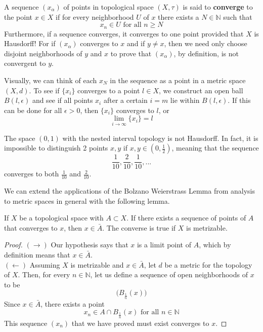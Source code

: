 \documentclass{article}
\begin{document}
    \begin{definition}
    A sequence $(x_\alpha)$ of points in topological space $(X, \tau)$ is said to \textbf{converge} to the point $x \in X$ if for every neighborhood $U$ of $x$ there exists a $N \in \mathbb{N}$ such that
    \[x_n \in U \text{ for all } n \geq N\]
    Furthermore, if a sequence converges, it converges to one point provided that $X$ is Hausdorff! For if $(x_\alpha)$ converges to $x$ and if $y \neq x$, then we need only choose disjoint neighborhoods of $y$ and $x$ to prove that $(x_\alpha)$, by definition, is not convergent to $y$.
    \end{definition}

    Visually, we can think of each $x_N$ in the sequence as a point in a metric space $(X, d)$. To see if $\{ x_i \}$ converges to a point $l \in X$, we construct an open ball $B(l, \epsilon)$ and see if all points $x_i$ after a certain $i = m$ lie within $B (l, \epsilon)$. If this can be done for all $\epsilon > 0$, then $\{ x_i \}$ converges to $l$, or 
    \[\lim_{i \to \infty} \{ x_i \} = l \]

    \begin{example}
    The space $(0,1)$ with the nested interval topology is not Hausdorff. In fact, it is impossible to distinguish 2 points $x, y$ if $x, y \in (0, \frac{1}{2})$, meaning that the sequence
    \[\frac{1}{10}, \frac{2}{10}, \frac{1}{10}, ...\]
    converges to both $\frac{1}{10}$ and $\frac{2}{10}$.
    \end{example} 

    We can extend the applications of the Bolzano Weierstrass Lemma from analysis to metric spaces in general with the following lemma. 

    \begin{lemma}
    If $X$ be a topological space with $A \subset X$. If there exists a sequence of points of $A$ that converges to $x$, then $x \in \bar{A}$. The converse is true if $X$ is metrizable. 
    \end{lemma}
    \begin{proof}
    $(\rightarrow)$ Our hypothesis says that $x$ is a limit point of $A$, which by definition means that $x \in \bar{A}$. \\
    $(\leftarrow)$ Assuming $X$ is metrizable and $x \in \bar{A}$, let $d$ be a metric for the topology of $X$. Then, for every $n \in \mathbb{N}$, let us define a sequence of open neighborhoods of $x$ to be
    \[\big(B_{\frac{1}{n}} (x) \big)\]
    Since $x \in \bar{A}$, there exists a point 
    \[x_n \in A \cap B_{\frac{1}{n}} (x) \text{ for all } n \in \mathbb{N}\]
    This sequence $(x_n)$ that we have proved must exist converges to $x$. 
    \end{proof}
\end{document}
